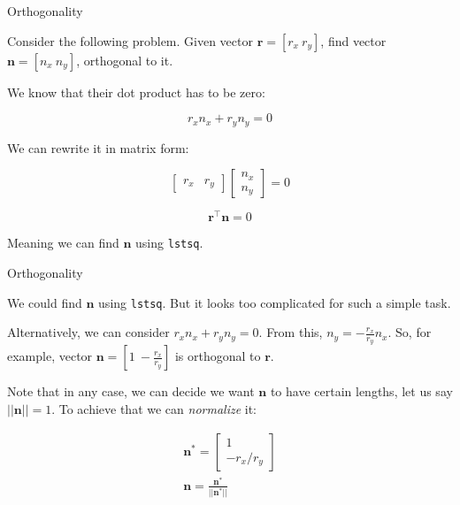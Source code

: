 \documentclass{beamer}
\begin{document}
\begin{frame}{Orthogonality}
\begin{flushleft}
	
	Consider the following problem. Given vector $\mathbf r = [r_x \ r_y]$, find vector $\mathbf n = [n_x \ n_y]$, orthogonal to it.
	
	\bigskip
	
	We know that their dot product has to be zero:
	
	\begin{equation}
		r_x n_x + r_y n_y = 0
	\end{equation}	

	We can rewrite it in matrix form:
	
	
	\begin{equation}
		\begin{bmatrix}
			r_x & r_y
		\end{bmatrix}
		\begin{bmatrix}
		n_x \\ n_y
		\end{bmatrix} = 0
	\end{equation}

\begin{equation}
\mathbf r^\top
\mathbf n = 0
\end{equation}	
	
Meaning we can find $\mathbf n$	using \texttt{lstsq}.
	
	
\end{flushleft}
\end{frame}




\begin{frame}{Orthogonality}
	\begin{flushleft}
		
		We could find $\mathbf n$ using \texttt{lstsq}. But it looks too complicated for such a simple task.
		
		\bigskip
		
		 Alternatively, we can consider $r_x n_x + r_y n_y = 0$. From this, $n_y = -\frac{r_x}{r_y} n_x$. So, for example, vector $\mathbf n = [1 \ -\frac{r_x}{r_y}]$ is orthogonal to $\mathbf r$.
		 
		 Note that in any case, we can decide we want $\mathbf n$ to have certain lengths, let us say $||\mathbf n|| = 1$. To achieve that we can \emph{normalize} it:
		 
		 \begin{align}
		 	\mathbf n^* = 
		 	\begin{bmatrix}
		 		1 \\ -r_x / r_y
		 	\end{bmatrix}\\
		 	\mathbf n = \frac{\mathbf n^*}{||\mathbf n^*||}
		 \end{align}
		
		
	\end{flushleft}
\end{frame}
\end{document}
